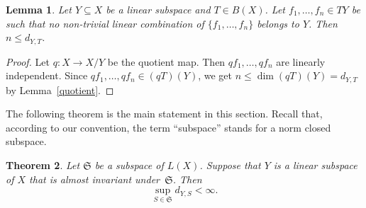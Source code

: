 \documentclass[12pt]{amsart}
\theoremstyle{plain}
\newtheorem{theorem}{Theorem}[section]
\newtheorem{lemma}[theorem]{Lemma}
\theoremstyle{definition}
\theoremstyle{remark}
\begin{document}
\begin{lemma}\label{min-dim}
Let $Y\subseteq X$ be a linear subspace and $T\in B(X)$. Let 
$f_1,\dots,f_n\in TY$ be such that no non-trivial linear combination of 
$\{f_1,\dots,f_n\}$ belongs to $Y$. Then $n{\leqslant} d_{Y,T}$.
\end{lemma}
\begin{proof}
Let $q:X\to X/Y$ be the quotient map. Then $qf_1,\dots,qf_n$ are linearly independent. Since $qf_1,\dots,qf_n\in (qT)(Y)$, we get $n{\leqslant}\dim(qT)(Y)=d_{Y,T}$ by Lemma~\ref{quotient}.
\end{proof}

The following theorem is the main statement in this section. Recall that, according to our convention, the term ``subspace'' stands for a norm closed subspace.

\begin{theorem}\label{uniform-bdd}
Let $\mathfrak S$ be a subspace of $L(X)$. Suppose that $Y$ is a linear subspace of $X$ that is almost invariant under~$\mathfrak S$. Then
\begin{displaymath}
 \sup\limits_{S\in\mathfrak S}d_{Y,S}<\infty.
\end{displaymath}
\end{theorem}
\end{document}
